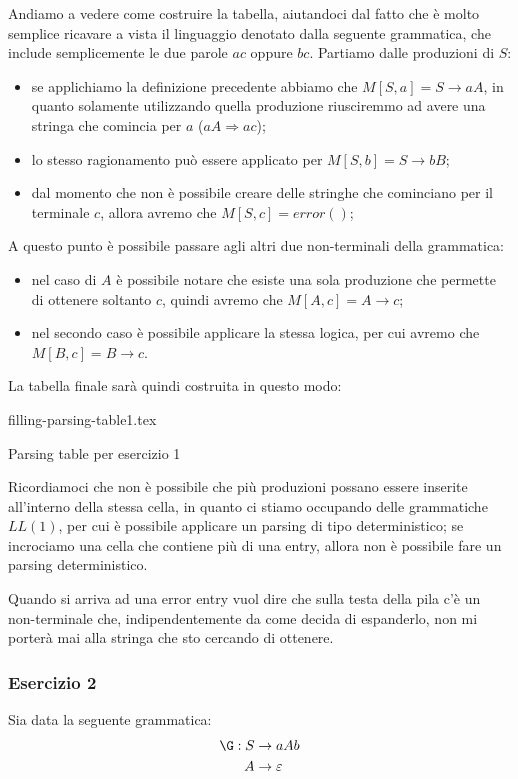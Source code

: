 \documentclass[class=book, crop=false, oneside, 12pt]{standalone}
\begin{document}
Andiamo a vedere come costruire la tabella, aiutandoci dal fatto che è molto semplice ricavare a vista il linguaggio denotato dalla seguente grammatica, che include semplicemente le due parole \(ac\) oppure \(bc\). Partiamo dalle produzioni di \(S\):
\begin{itemize}
    \item se applichiamo la definizione precedente abbiamo che \(M[S, a] = S \rightarrow aA\), in quanto solamente utilizzando quella produzione riusciremmo ad avere una stringa che comincia per \(a\) (\(aA \Rightarrow ac\));
    \item lo stesso ragionamento può essere applicato per \(M[S, b] = S \rightarrow bB\);
    \item dal momento che non è possibile creare delle stringhe che cominciano per il terminale \(c\), allora avremo che \(M[S, c] = error()\);
\end{itemize}
A questo punto è possibile passare agli altri due non-terminali della grammatica: 
\begin{itemize}
    \item nel caso di \(A\) è possibile notare che esiste una sola produzione che permette di ottenere soltanto \(c\), quindi avremo che \(M[A, c] = A \rightarrow c\);
    \item nel secondo caso è possibile applicare la stessa logica, per cui avremo che \(M[B, c] = B \to c\).
\end{itemize} 
La tabella finale sarà quindi costruita in questo modo:
\begin{table}[H]
	\centering
	{filling-parsing-table1.tex}
    \caption{Parsing table per esercizio 1}
    \label{filling-parsing-table1}
\end{table} 
Ricordiamoci che non è possibile che più produzioni possano essere inserite all'interno della stessa cella, in quanto ci stiamo occupando delle grammatiche \(LL(1)\), per cui è possibile applicare un parsing di tipo deterministico; se incrociamo una cella che contiene più di una entry, allora non è possibile fare un parsing deterministico.

Quando si arriva ad una error entry vuol dire che sulla testa della pila c'è un non-terminale che, indipendentemente da come decida di espanderlo, non mi porterà mai alla stringa che sto cercando di ottenere. 

\subsubsection{Esercizio 2}
Sia data la seguente grammatica:
\begin{align*}
    \G: S &\rightarrow aAb \\
    A &\rightarrow \varepsilon
\end{align*}
\end{document}
